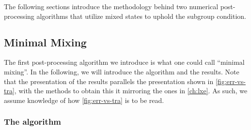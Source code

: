 The following sections introduce the methodology behind two numerical
post-processing algorithms that utilize mixed states to uphold the subgroup
condition. 

\subsection{Minimal Mixing}\label{sec:minimal-mixing}

The first post-processing algorithm we introduce is what one could call
\enquote{minimal mixing}. In the following, we will introduce the algorithm and
the results. Note that the presentation of the results parallels the
presentation shown in \cref{fig:err-vs-tra}, with the methods to obtain this
it mirroring the ones in \cref{ch:lxe}. As such, we assume knowledge of how
\cref{fig:err-vs-tra} is to be read.

\subsubsection{The algorithm}

